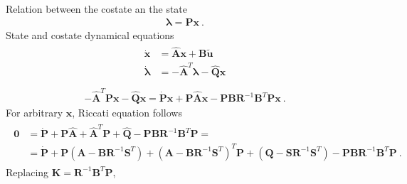 \documentclass[letterpaper,10pt,english]{jupyterBook}
\begin{document}
\sphinxAtStartPar
Relation between the co\sphinxhyphen{}state an the state
\begin{equation*}
\begin{split}\boldsymbol\lambda = \mathbf{P} \mathbf{x} \ .\end{split}
\end{equation*}
\sphinxAtStartPar
State and co\sphinxhyphen{}state dynamical equations
\begin{equation*}
\begin{split}\begin{aligned}
  \dot{\mathbf{x}} & = \hat{\mathbf{A}} \mathbf{x} + \mathbf{B} \widetilde{\mathbf{u}} \\
  \dot{\boldsymbol\lambda} & = - \hat{\mathbf{A}}^T \boldsymbol{\lambda} - \hat{\mathbf{Q}} \mathbf{x} \\
\end{aligned}\end{split}
\end{equation*}
\sphinxAtStartPar
{}
\begin{equation*}
\begin{split}-\hat{\mathbf{A}}^T \mathbf{P} \mathbf{x} - \hat{\mathbf{Q}} \mathbf{x} = \dot{\mathbf{P}} \mathbf{x} + \mathbf{P} \hat{\mathbf{A}} \mathbf{x} - \mathbf{P} \mathbf{B} \mathbf{R}^{-1} \mathbf{B}^T \mathbf{P} \mathbf{x} \ . \end{split}
\end{equation*}
\sphinxAtStartPar
For arbitrary \(\mathbf{x}\), Riccati equation follows
\begin{equation*}
\begin{split}\begin{aligned}
\mathbf{0} 
 & = \dot{\mathbf{P}} + \mathbf{P} \hat{\mathbf{A}} + \hat{\mathbf{A}}^T \mathbf{P} + \hat{\mathbf{Q}} - \mathbf{P} \mathbf{B} \mathbf{R}^{-1} \mathbf{B}^T \mathbf{P} = \\
 & = \dot{\mathbf{P}} + \mathbf{P} \left( \mathbf{A} - \mathbf{B} \mathbf{R}^{-1} \mathbf{S}^T \right) + \left( \mathbf{A} - \mathbf{B} \mathbf{R}^{-1} \mathbf{S}^T \right)^T \mathbf{P} + \left( \mathbf{Q} - \mathbf{S} \mathbf{R}^{-1} \mathbf{S}^T \right) - \mathbf{P} \mathbf{B} \mathbf{R}^{-1} \mathbf{B}^T \mathbf{P} \ .
\end{aligned}\end{split}
\end{equation*}
\sphinxAtStartPar
{} Replacing \(\mathbf{K} = \mathbf{R}^{-1} \mathbf{B}^T \mathbf{P}\),
\end{document}
